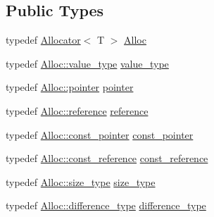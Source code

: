 \subsection*{Public Types}
\begin{DoxyCompactItemize}
\item 
typedef \hyperlink{classprism_1_1_allocator}{Allocator}$<$ T $>$ \hyperlink{classprism_1_1_logger_allocator_a9460c1779c8a7240844ee66d65184275}{Alloc}
\item 
typedef \hyperlink{classprism_1_1_allocator_a45426ee64e0aba097a532e0ef5ff5700}{Alloc\+::value\+\_\+type} \hyperlink{classprism_1_1_logger_allocator_a23e55c625e69c725c9704a1031a1b2b3}{value\+\_\+type}
\item 
typedef \hyperlink{classprism_1_1_allocator_ad3c6706a7243bd3ef489e16d34d5750f}{Alloc\+::pointer} \hyperlink{classprism_1_1_logger_allocator_aa39096d64ef616bad095b6439bcb1bbe}{pointer}
\item 
typedef \hyperlink{classprism_1_1_allocator_a5dde9876d2ed0ca292d8a2019ac2836f}{Alloc\+::reference} \hyperlink{classprism_1_1_logger_allocator_a7b3d035e8bae517d30ec47fee59cc450}{reference}
\item 
typedef \hyperlink{classprism_1_1_allocator_af6a4a91dfc203203ecc319a457ce4dce}{Alloc\+::const\+\_\+pointer} \hyperlink{classprism_1_1_logger_allocator_a7fd30d7613bea70e48af8fbd94460467}{const\+\_\+pointer}
\item 
typedef \hyperlink{classprism_1_1_allocator_a89911899c97ae877a81b798957a2d899}{Alloc\+::const\+\_\+reference} \hyperlink{classprism_1_1_logger_allocator_a43e29d3baf22667bcebda8345fb5b101}{const\+\_\+reference}
\item 
typedef \hyperlink{classprism_1_1_allocator_a47cb9435e4e9ff4c934ea3d4b4338d52}{Alloc\+::size\+\_\+type} \hyperlink{classprism_1_1_logger_allocator_ab894ebf5870879f400300cd482961c94}{size\+\_\+type}
\item 
typedef \hyperlink{classprism_1_1_allocator_a1769ae6e60e970a4d30ee15275f7ac6d}{Alloc\+::difference\+\_\+type} \hyperlink{classprism_1_1_logger_allocator_ad9285548751a3bd2d51fbf39d2b33f2a}{difference\+\_\+type}
\end{DoxyCompactItemize}
